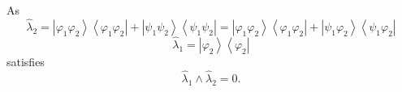 \documentclass[aps,preprint]{revtex4}%
\begin{document}
\begin{enumerate}
\begin{equation}
\end{equation}
As%
\begin{equation}
\hat{\lambda}_{2}=\left\vert \varphi_{1}\varphi_{2}\right\rangle \left\langle
\varphi_{1}\varphi_{2}\right\vert +\left\vert \psi_{1}\psi_{2}\right\rangle
\left\langle \psi_{1}\psi_{2}\right\vert =\left\vert \varphi_{1}\varphi
_{2}\right\rangle \left\langle \varphi_{1}\varphi_{2}\right\vert +\left\vert
\psi_{1}\varphi_{2}\right\rangle \left\langle \psi_{1}\varphi_{2}\right\vert
\end{equation}%
\begin{equation}
\hat{\lambda}_{1}=\left\vert \varphi_{2}\right\rangle \left\langle \varphi
_{2}\right\vert
\end{equation}
satisfies
\begin{equation}
\hat{\lambda}_{1}\wedge\hat{\lambda}_{2}=0.
\end{equation}

\end{enumerate}
\end{document}
